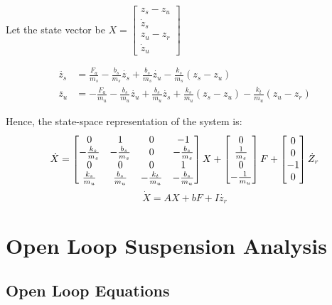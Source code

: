 \documentclass[12pt, a4paper, oneside]{report}
\begin{document}
Let the state vector be $X = \begin{bmatrix}
    z_s -z_u \\
    \dot z_s \\
    z_u - z_r \\
    \dot z_u
    \end{bmatrix}$


\begin{align}
        \ddot{z_s} & = \frac{F_a}{m_s} - \frac{b_s}{m_s} \dot{z_s} + \frac{b_s}{m_s} \dot{z_u}- \frac{k_s}{m_s} (z_s - z_u) \\
        \ddot{z_u} & = -\frac{F_a}{m_u} - \frac{b_s}{m_u} \dot{z_u} + \frac{b_s}{m_u} \dot{z_s} + \frac{k_s}{m_u} (z_s - z_u) - \frac{k_t}{m_u} (z_u - z_r) 
\end{align}


Hence, the state-space representation of the system is:
\begin{equation}
    \dot X = \begin{bmatrix}
        0 & 1 & 0 & -1 \\
        -\frac{k_s}{m_s} & -\frac{b_s}{m_s} & 0 & -\frac{b_s}{m_s} \\
        0 & 0 & 0 & 1 \\
        \frac{k_s}{m_u} & \frac{b_s}{m_u} & -\frac{k_t}{m_u} & -\frac{b_s}{m_u} 
    \end{bmatrix}
    X + \begin{bmatrix}
        0 \\
        \frac{1}{m_s} \\
        0 \\
        -\frac{1}{m_u}
    \end{bmatrix} F
    + \begin{bmatrix}
        0 \\
        0 \\
        -1 \\
        0
    \end{bmatrix} \dot Z_r \\
\end{equation}
\begin{equation}
    \dot X = AX + bF + I \dot{z_r}
\end{equation}

\section{Open Loop Suspension Analysis}

\subsection{Open Loop Equations}
\end{document}

